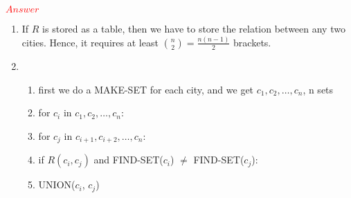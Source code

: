 \documentclass[11pt,twoside]{article}
\begin{document}
\begin{enumerate}[leftmargin=0pt]
\begin{enumerate}
\end{enumerate}
\textcolor{red}{$Answer$}                                                                                                                                                                                                   
\begin{enumerate}

\item If $R$ is stored as a table, then we have to store the relation between any two cities.
Hence, it requires at least ${n \choose 2} = \frac{n(n-1)}{2}$ brackets.
\item
	\begin{enumerate}[label = {\arabic*}]
	\item first we do a MAKE-SET for each city, and we get $c_1, c_2, \dots, c_n$, n sets
	\item	for $c_i$ in $c_1, c_2, \dots, c_n$:
	\item \hskip2pc  for $c_j$ in $c_{i+1}, c_{i+2}, \dots, c_n$:
	\item  \hskip4pc  if $R(c_i, c_j)$ and FIND-SET($c_i$)  $\neq$ FIND-SET($c_j$): 
	\item  \hskip6pc  UNION($c_i$, $c_j$)
	\end{enumerate}
	

\end{enumerate}
\end{enumerate}
\end{document}
